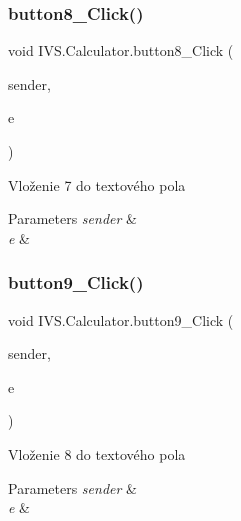 \subsubsection{\texorpdfstring{button8\+\_\+\+Click()}{button8\_Click()}}
{\footnotesize\ttfamily void I\+V\+S.\+Calculator.\+button8\+\_\+\+Click (\begin{DoxyParamCaption}\item[{object}]{sender,  }\item[{Event\+Args}]{e }\end{DoxyParamCaption})\hspace{0.3cm}{\ttfamily [protected]}}



Vloženie \textquotesingle{}7\textquotesingle{} do textového pola 


\begin{DoxyParams}{Parameters}
{\em sender} & \\
\hline
{\em e} & \\
\hline
\end{DoxyParams}
\mbox{\label{class_i_v_s_1_1_calculator_ad6751dcda5da874d2c4c933020f5bc70}} 
\subsubsection{\texorpdfstring{button9\+\_\+\+Click()}{button9\_Click()}}
{\footnotesize\ttfamily void I\+V\+S.\+Calculator.\+button9\+\_\+\+Click (\begin{DoxyParamCaption}\item[{object}]{sender,  }\item[{Event\+Args}]{e }\end{DoxyParamCaption})\hspace{0.3cm}{\ttfamily [protected]}}



Vloženie \textquotesingle{}8\textquotesingle{} do textového pola 


\begin{DoxyParams}{Parameters}
{\em sender} & \\
\hline
{\em e} & \\
\hline
\end{DoxyParams}
\mbox{\label{class_i_v_s_1_1_calculator_a3c3a8cab086cf9f773e7b4dbddcbad58}} 
